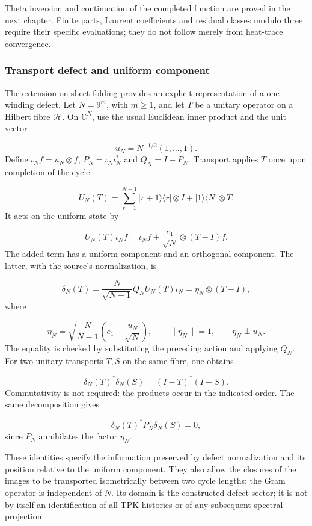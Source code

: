 Theta inversion and continuation of the completed function are proved in the next chapter. Finite parts, Laurent coefficients and residual classes modulo three require their specific evaluations; they do not follow merely from heat-trace convergence.

\subsubsection*{Transport defect and uniform component}
The extension on sheet folding provides an explicit representation of a one-winding defect. Let \(N=9^m\), with \(m\ge1\), and let \(T\) be a unitary operator on a Hilbert fibre \(\mathcal H\). On \(\mathbb C^N\), use the usual Euclidean inner product and the unit vector

\[
u_N=N^{-1/2}(1,\ldots,1).
\]
Define \(\iota_Nf=u_N\otimes f\), \(P_N=\iota_N\iota_N^*\) and \(Q_N=I-P_N\). Transport applies \(T\) once upon completion of the cycle:

\[
U_N(T)=\sum_{r=1}^{N-1}|r+1\rangle\langle r|\otimes I
+|1\rangle\langle N|\otimes T.
\]
It acts on the uniform state by

\[
U_N(T)\iota_N f
=\iota_N f+\frac{e_1}{\sqrt N}\otimes(T-I)f.
\]
The added term has a uniform component and an orthogonal component. The latter, with the source's normalization, is

\[
\delta_N(T)=\frac{N}{\sqrt{N-1}}Q_NU_N(T)\iota_N
=\eta_N\otimes(T-I),
\]
where

\[
\eta_N=\sqrt{\frac N{N-1}}\left(e_1-\frac{u_N}{\sqrt N}\right),
\qquad \|\eta_N\|=1,\qquad \eta_N\perp u_N.
\]
The equality is checked by substituting the preceding action and applying \(Q_N\). For two unitary transports \(T,S\) on the same fibre, one obtains

\[
\delta_N(T)^*\delta_N(S)=(I-T)^*(I-S).
\]
Commutativity is not required: the products occur in the indicated order. The same decomposition gives

\[
\delta_N(T)^*P_N\delta_N(S)=0,
\]
since \(P_N\) annihilates the factor \(\eta_N\).

These identities specify the information preserved by defect normalization and its position relative to the uniform component. They also allow the closures of the images to be transported isometrically between two cycle lengths: the Gram operator is independent of \(N\). Its domain is the constructed defect sector; it is not by itself an identification of all TPK histories or of any subsequent spectral projection.

